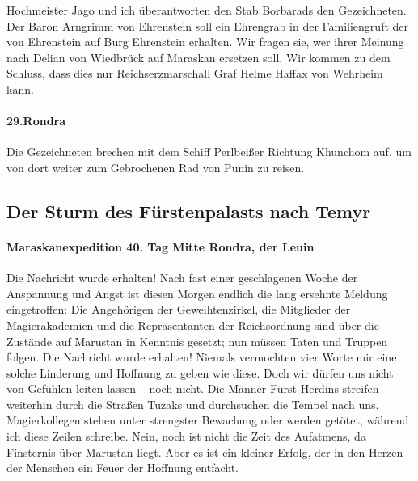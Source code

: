 Hochmeister Jago und ich überantworten den Stab Borbarads den Gezeichneten. Der Baron Arngrimm von Ehrenstein soll ein Ehrengrab in der Familiengruft der von Ehrenstein auf Burg Ehrenstein erhalten. Wir fragen sie, wer ihrer Meinung nach Delian von Wiedbrück auf Maraskan ersetzen soll. Wir kommen zu dem Schluss, dass dies nur Reichserzmarschall Graf Helme Haffax von Wehrheim kann.

\paragraph{29.Rondra}
Die Gezeichneten brechen mit dem Schiff Perlbeißer Richtung Khunchom auf, um von dort weiter zum Gebrochenen Rad von Punin zu reisen.

\subsection{Der Sturm des Fürstenpalasts nach Temyr}

\paragraph{Maraskanexpedition 40. Tag Mitte Rondra, der Leuin}
Die Nachricht wurde erhalten! Nach fast einer geschlagenen Woche der Anspannung und Angst ist diesen Morgen endlich die lang ersehnte Meldung eingetroffen: Die Angehörigen der Geweihtenzirkel, die Mitglieder der Magierakademien und die Repräsentanten der Reichsordnung sind über die Zustände auf Marustan in Kenntnis gesetzt; nun müssen Taten und Truppen folgen. Die Nachricht wurde erhalten! Niemals vermochten vier Worte mir eine solche Linderung und Hoffnung zu geben wie diese. Doch wir dürfen uns nicht von Gefühlen leiten lassen -- noch nicht. Die Männer Fürst Herdins streifen weiterhin durch die Straßen Tuzaks und durchsuchen die Tempel nach uns. Magierkollegen stehen unter strengster Bewachung oder werden getötet, während ich diese Zeilen schreibe. Nein, noch ist nicht die Zeit des Aufatmens, da Finsternis über Marustan liegt. Aber es ist ein kleiner Erfolg, der in den Herzen der Menschen ein Feuer der Hoffnung entfacht.


